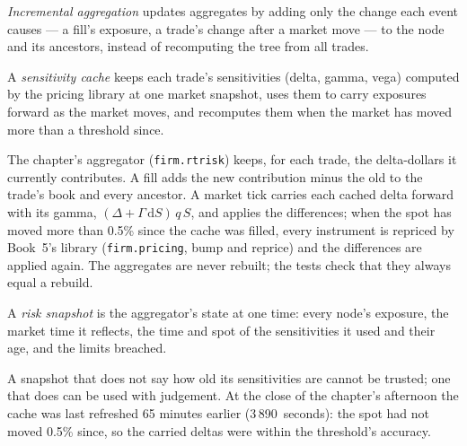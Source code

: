 \begin{definition}\label{def:pl:real-time-risk:incremental}
\emph{Incremental aggregation} updates aggregates by adding only the change each event causes --- a fill's
exposure, a trade's change after a market move --- to the node and its ancestors, instead of recomputing the tree from all trades.
\end{definition}

\begin{definition}\label{def:pl:real-time-risk:cache}
A \emph{sensitivity cache} keeps each trade's sensitivities (delta, gamma, vega) computed by the pricing library at
one market snapshot, uses them to carry exposures forward as the market moves, and recomputes them when the market has moved more than a
threshold since.
\end{definition}

The chapter's aggregator (\texttt{firm.rtrisk}) keeps, for each trade, the delta-dollars it currently contributes. A fill adds the new
contribution minus the old to the trade's book and every ancestor. A market tick carries each cached delta forward with its gamma, $(\Delta +
\Gamma\,\mathrm{d}S)\,q\,S$, and applies the differences; when the spot has moved more than 0.5\% since the cache was filled, every
instrument is repriced by Book~5's library (\texttt{firm.pricing}, bump and reprice) and the differences are applied again. The aggregates are
never rebuilt; the tests check that they always equal a rebuild.

\label{lst:pl:real-time-risk:cache}

\label{lst:pl:real-time-risk:aggregator}

\begin{definition}\label{def:pl:real-time-risk:snapshot}
A \emph{risk snapshot} is the aggregator's state at one time: every node's exposure, the market time it reflects, the
time and spot of the sensitivities it used and their age, and the limits breached.
\end{definition}

A snapshot that does not say how old its sensitivities are cannot be trusted; one that does can be used with judgement. At the close of the
chapter's afternoon the cache was last refreshed 65 minutes earlier (3\,890~seconds): the spot had not moved 0.5\% since, so the carried
deltas were within the threshold's accuracy.

